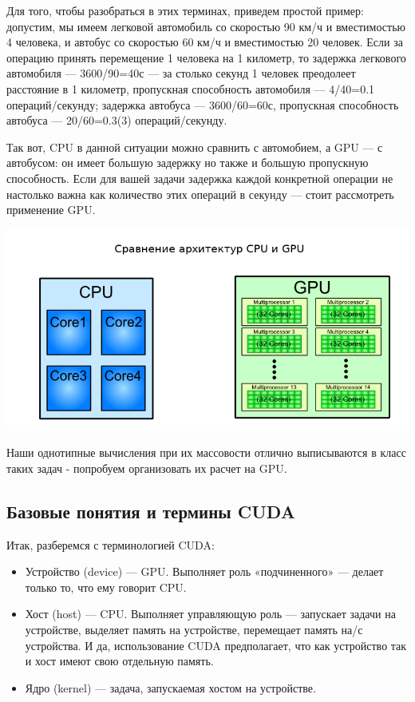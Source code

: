 \documentclass[12pt,a4paper]{scrartcl}
\begin{document}
Для того, чтобы разобраться в этих терминах, приведем простой пример: допустим, мы имеем легковой автомобиль со скоростью 90 км/ч и вместимостью 4 человека, и автобус со скоростью 60 км/ч и вместимостью 20 человек. Если за операцию принять перемещение 1 человека на 1 километр, то задержка легкового автомобиля — 3600/90=40с — за столько секунд 1 человек преодолеет расстояние в 1 километр, пропускная способность автомобиля — 4/40=0.1 операций/секунду; задержка автобуса — 3600/60=60с, пропускная способность автобуса — 20/60=0.3(3) операций/секунду.

Так вот, CPU в данной ситуации можно сравнить с автомобием, а GPU — с автобусом: он имеет большую задержку но также и большую пропускную способность. Если для вашей задачи задержка каждой конкретной операции не настолько важна как количество этих операций в секунду — стоит рассмотреть применение GPU.

\includegraphics[scale=0.5]{./pictures/Arch.png}

Наши однотипные вычисления при их массовости отлично выписываются в класс таких задач - попробуем организовать их расчет на GPU. 

\subsection{Базовые понятия и термины CUDA}

Итак, разберемся с терминологией CUDA:

\begin{itemize}
\item Устройство (device) — GPU. Выполняет роль «подчиненного» — делает только то, что ему говорит CPU.
\item Хост (host) — CPU. Выполняет управляющую роль — запускает задачи на устройстве, выделяет память на устройстве, перемещает память на/с устройства. И да, использование CUDA предполагает, что как устройство так и хост имеют свою отдельную память.
\item Ядро (kernel) — задача, запускаемая хостом на устройстве.
\end{itemize}
\end{document}
